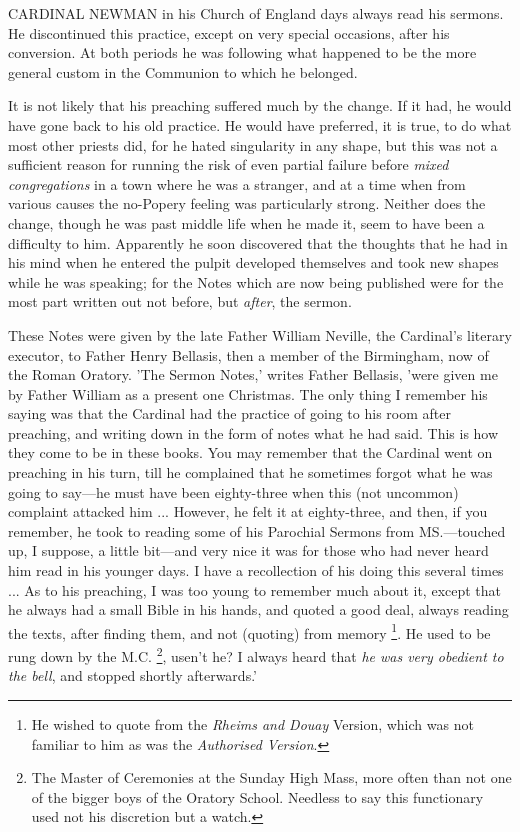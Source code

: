 
CARDINAL
NEWMAN in his Church of England
days always read his sermons. He discontinued this practice, except on
very special occasions, after his conversion. At both periods he was
following what happened to be the more general custom in the Communion
to which he belonged.

It is not likely that his preaching suffered much
by the change. If it had, he would have gone back to his old practice.
He would have preferred, it is true, to do what most other priests
did, for he hated singularity in any shape, but this was not a
sufficient reason for running the risk of even partial failure before \emph{mixed
congregations} in a
town where he was a stranger, and at a time when from various causes
the no-Popery feeling was particularly strong. Neither does the
change, though he was past middle life when he made it, seem to have
been a difficulty to him. Apparently he soon discovered that the
thoughts that he had in his mind when he entered the pulpit developed
themselves and took new shapes while he was speaking; for the Notes
which are now being published were for the most part written out not
before, but \emph{after},
the sermon.

These Notes were given by the late Father William
Neville, the Cardinal's literary executor, to Father Henry Bellasis,
then a member of the Birmingham, now of the Roman Oratory. 'The Sermon
Notes,' writes Father Bellasis, 'were given me by Father William as a
present one Christmas. The only thing I remember his saying was that
the Cardinal had the practice of going to his room after preaching,
and writing down in the form of notes what he had said. This is how
they come to be in these books. You may remember that the Cardinal
went on preaching in his turn, till he complained that he sometimes
forgot what he was going to say—he must have been eighty-three when
this (not uncommon) complaint attacked him ... However, he felt it at
eighty-three, and then, if you remember, he took to reading some of
his Parochial Sermons from MS.—touched up, I suppose, a little
bit—and very nice it was for those who had never heard him read in
his younger days. I have a recollection of his doing this several
times ... As to his preaching, I was too young to remember much about
it, except that he always had a small Bible in his hands, and quoted a
good deal, always reading the texts, after finding them, and not
(quoting) from memory \footnote{He wished to quote from the \emph{Rheims and
Douay} Version, which was not familiar to him as was the \emph{Authorised
Version}.}. He
used to be rung down by the M.C. \footnote{The Master of Ceremonies at the Sunday High Mass, more often than not
one of the bigger boys of the Oratory School. Needless to say this
functionary used not his discretion but a watch.}, usen't he? I always heard that \emph{he was very obedient to the
bell}, and stopped shortly afterwards.'

